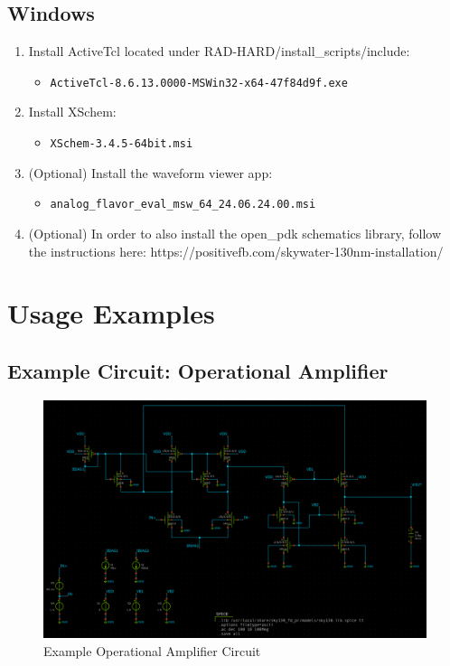 \documentclass[12pt]{article}
\begin{document}
    \subsection{Windows}\label{subsec:installation-windows}
    \begin{enumerate}
        \item Install ActiveTcl located under RAD-HARD/install\_scripts/include:
        \begin{itemize}
            \item \texttt{ActiveTcl-8.6.13.0000-MSWin32-x64-47f84d9f.exe}
        \end{itemize}

        \item Install XSchem:
        \begin{itemize}
            \item \texttt{XSchem-3.4.5-64bit.msi}
        \end{itemize}

        \item (Optional) Install the waveform viewer app:
        \begin{itemize}
            \item \texttt{analog\_flavor\_eval\_msw\_64\_24.06.24.00.msi}
        \end{itemize}

        \item (Optional) In order to also install the open\_pdk schematics library, follow the instructions here: https://positivefb.com/skywater-130nm-installation/
    \end{enumerate}


    \section{Usage Examples}\label{sec:usage-examples}

    \subsection{Example Circuit: Operational Amplifier}\label{subsec:example-circuit-operational-amplifier}
    \begin{figure}[htbp]
        \centering
        \includegraphics[width=0.8\linewidth]{example_circuit_opamp}
        \caption{Example Operational Amplifier Circuit}
        \label{fig:opamp}
    \end{figure}
\end{document}
